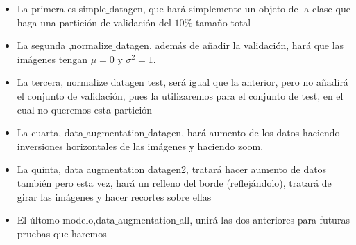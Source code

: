 \documentclass[11pt]{article}
\begin{document}
\begin{itemize}
\item La primera es simple$\_$datagen, que hará simplemente un objeto de la clase que haga una partición de validación del $10\%$ tamaño total

\item La segunda ,normalize$\_$datagen, además de añadir la validación, hará que las imágenes tengan $\mu = 0$ y $\sigma ^2 = 1$.

\item La tercera, normalize$\_$datagen$\_$test, será igual que la anterior, pero no añadirá el conjunto de validación, pues la utilizaremos para el conjunto de test, en el cual no queremos esta partición

\item La cuarta, data$\_$augmentation$\_$datagen, hará aumento de los datos haciendo inversiones horizontales de las imágenes y haciendo zoom.

\item La quinta, data$\_$augmentation$\_$datagen2, tratará hacer aumento de datos también pero esta vez, hará un relleno del borde (reflejándolo), tratará de girar las imágenes y hacer recortes sobre ellas

\item El últomo modelo,data$\_$augmentation$\_$all, unirá las dos anteriores para futuras pruebas que haremos

\end{itemize}
\end{document}
